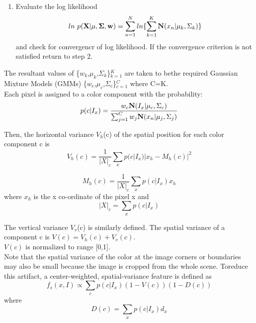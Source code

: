 \documentclass[11pt]{report}
\begin{document}
\begin{enumerate}
\item Evaluate the log likelihood
\begin{equation}
ln \  p({\bf X}|{\bf \mu},{\bf \Sigma},{\bf w}) =\sum ^N_{n=1} ln \{  \sum^K_{k=1} {\bf N}(x_n|\mu_k,\Sigma_k) \}
\end{equation} 
and check for convergencr of log likelihood.
If the convergence criterion is not satisfied return to step 2.
\end{enumerate}


The resultant values of \{$w_k$,$\mu_k$,$\Sigma_k$\}$^K_{k=1}$  are taken to bethe required Gaussian Mixture Models (GMMs) \{$w_c$,$\mu_c$,$\Sigma_c$\}$^C_{c=1}$ where C=K.\\
Each pixel is assigned to a color component with the probability:
\begin{equation}
p(c|I_x) = \frac {w_c{\bf  N}(I_x|\mu_c,\Sigma_c)}{\sum_{j=1}^C w_j {\bf  N}(x_n|\mu_j,\Sigma_j)}
\end{equation} 

Then, the horizontal variance $V_h$(c) of the spatial position for each color component c is
\begin{equation}
V_h(c) = \frac{1}{|X|_c} \sum_x p(c|I_x)  |x_h - M_h(c)|^2
\end{equation} 

\begin{equation}
M_h(c) = \frac{1}{|X|_c} \sum_x p(c|I_x)  x_h
\end{equation} 
where $x_h$ is the x co-ordinate of the pixel x and 
\begin{equation}
|X|_c = \sum_x p(c|I_x) 
\end{equation} 

The vertical variance $V_v$(c) is similarly defined.
The spatial variance of a component c is $V(c) = V_h(c) + V_v(c)$.\\
$V(c)$ is normalized to range [0,1]. \\

Note that the spatial variance of the color at the image corners or boundaries may also be small because the image is cropped from the whole scene. 
Toreduce this artifact, a center-weighted, spatial-variance feature is defined as
\begin{equation}
f_s(x,I) \propto \sum_c p(c|I_x) (1-V(c))(1-D(c))
\end{equation} 
where 
\begin{equation}
D(c) = \sum_x p(c|I_x)  d_x
\end{equation} 
\end{document}
